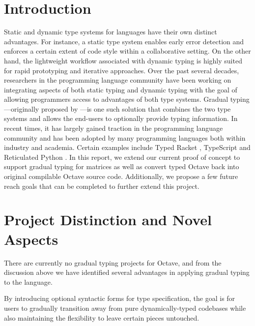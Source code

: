 \newcommand{\fig}[2]{\texttt{[image: \#2]}}
\newcommand{\centerfig}[2]{\begin{center}
\color{black} \texttt{[image: \#2]}\end{center}}
\newcommand \bnfdef  {\mathrel{::=}}
\newcommand \bnfalt  {\mathrel{|}}
\newcommand \tc[3]{{#1} \vdash {#2} : {#3}}

\section{Introduction}
Static and dynamic type systems for languages have their own distinct advantages. For instance, a static type system enables early error detection and enforces a certain extent of code style within a collaborative setting. On the other hand, the lightweight workflow associated with dynamic typing is highly suited for rapid prototyping and iterative approaches. Over the past several decades, researchers in the programming language community have been working on integrating aspects of both static typing and dynamic typing with the goal of allowing programmers access to advantages of both type systems. Gradual typing---originally proposed by \citet{siek2006gradual}---is one such solution that combines the two type systems and allows the end-users to optionally provide typing information. In recent times, it has largely gained traction in the programming language community and has been adopted by many programming languages both within industry and academia. Certain examples include Typed Racket \cite{tobin2006interlanguage}, TypeScript \cite{bierman2014understanding} and Reticulated Python \cite{vitousek2014design}. In this report, we extend our current proof of concept to support gradual typing for matrices as well as convert typed Octave back into original compilable Octave source code. Additionally, we propose a few future reach goals that can be completed to further extend this project.

\section{Project Distinction and Novel Aspects}
There are currently no gradual typing projects for Octave, and from the discussion above we have identified several advantages in applying gradual typing to the language.

By introducing optional syntactic forms for type specification, the goal is for users to gradually transition away from pure dynamically-typed codebases while also maintaining the flexibility to leave certain pieces untouched.

